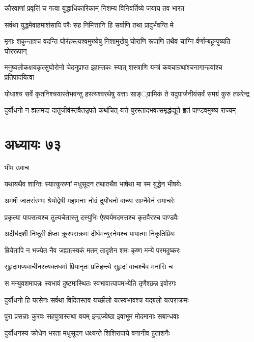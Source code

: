 \twolineshloka
{कौरवाणां प्रवृत्तिं च गत्वा युद्धाधिकारिकाम्}
{निशम्य विनिवर्तिष्ये जयाय तव भारत}


\twolineshloka
{सर्वथा युद्धमेवाहमाशंसापि परैः सह}
{निमित्तानि हि सर्वाणि तथा प्रादुर्भवन्ति मे}


\twolineshloka
{मृगाः शकुन्ताश्च वदन्ति घोरंहस्त्यश्वमुख्येषु निशामुखेषु}
{घोराणि रूपाणि तथैव चाग्नि-र्वर्णान्बहून्पुष्यति घोररूपान्}


\twolineshloka
{मनुष्यलोकक्षयकृत्सुघोरोनो चेदनुप्राप्त इहान्तकः स्यात्}
{शस्त्राणि यन्त्रं कवचान्रथांश्चनागान्हयांश्च प्रतिपादयित्वा}


\twolineshloka
{योधाश्च सर्वे कृतनिश्चयास्तेभवन्तु हस्त्यश्वरथेषु यत्ताः}
{साङ््ग्रामिकं ते यदुपार्जनीयंसर्वं समग्रं कुरु तन्नरेन्द्र}


\twolineshloka
{दुर्योधनो न ह्यलमद्य दातुंजीवंस्तवैतन्नृपते कथंचित्}
{यत्ते पुरस्तादभवत्समृद्धंद्यूते हृतं पाण्डवमुख्य राज्यम्}


\chapter{अध्यायः ७३}
\twolineshloka
{भीम उवाच}
{}


\twolineshloka
{यथायथैव शान्तिः स्यात्कुरूणां मधुसूदन}
{तथातथैव भाषेथा मा स्म युद्धेन भीषयेः}


\twolineshloka
{अमर्षी जातसंरम्भः श्रेयोद्वेषी महामनाः}
{नोग्रं दुर्योधनो वाच्यः साम्नैवेनं समाचरेः}


\twolineshloka
{प्रकृत्या पापसत्वश्च तुल्यचेतास्तु दस्युभिः}
{ऐश्वर्यमदमत्तश्च कृतवैरश्च पाण्डवैः}


\twolineshloka
{अदीर्घदर्शी निष्ठूरी क्षेप्ता क्रूरपराक्रमः}
{दीर्घमन्युरनेयश्च पापात्मा निकृतिप्रियः}


\twolineshloka
{म्रियेतापि न भज्येत नैव जह्यात्स्वकं मतम्}
{तादृशेन शमः कृष्ण मन्ये परमदुष्करः}


\twolineshloka
{सुहृदामप्यवाचीनस्त्यक्तधर्मा प्रियानृतः}
{प्रतिहन्त्ये सुहृदां वाचश्चैव मनांसि च}


\twolineshloka
{स मन्युवशमापन्नः स्वभावं दुष्टमास्थितः}
{स्वभावात्पापमभ्येति तृणैश्छन्न इवोरगः}


\twolineshloka
{दुर्योधनो हि यत्सेनः सर्वथा विदितस्तव}
{यच्छीलो यत्स्वभावश्च यद्बलो यत्पराक्रमः}


\twolineshloka
{पुरा प्रसन्नाः कुरवः सहपुत्रास्तथा वयम्}
{इन्द्रज्येष्ठा इवाभूम मोदमानाः सबान्धवाः}


\twolineshloka
{दुर्योधनस्य क्रोधेन भरता मधुसूदन}
{धक्ष्यन्ते शिशिरापाये वनानीव हुताशनैः}


